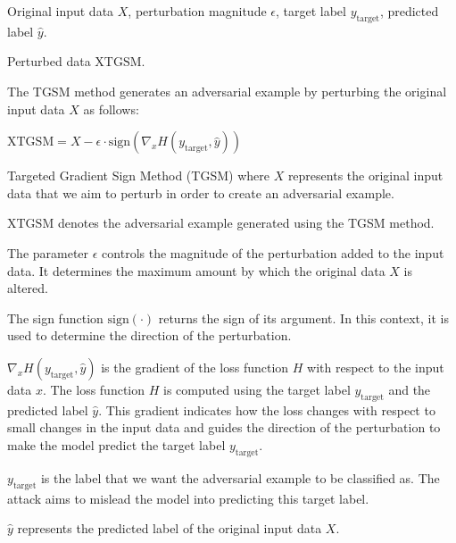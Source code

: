 
Original input data $X$, perturbation magnitude $\epsilon$, target label $y_{\text{target}}$, predicted label $\hat{y}$.

Perturbed data $\text{XTGSM}$.

The TGSM method generates an adversarial example by perturbing the original input data $X$ as follows:

$\text{XTGSM} = X - \epsilon \cdot \text{sign} \left( \nabla_x H(y_{\text{target}}, \hat{y}) \right)$

Targeted Gradient Sign Method (TGSM) where $X$ represents the original input data that we aim to perturb in order to create an adversarial example.

$\text{XTGSM}$ denotes the adversarial example generated using the TGSM method.

The parameter $\epsilon$ controls the magnitude of the perturbation added to the input data. It determines the maximum amount by which the original data $X$ is altered.

The sign function $\text{sign} \left( \cdot \right)$ returns the sign of its argument. In this context, it is used to determine the direction of the perturbation.

$\nabla_x H(y_{\text{target}}, \hat{y})$ is the gradient of the loss function $H$ with respect to the input data $x$. The loss function $H$ is computed using the target label $y_{\text{target}}$ and the predicted label $\hat{y}$. This gradient indicates how the loss changes with respect to small changes in the input data and guides the direction of the perturbation to make the model predict the target label $y_{\text{target}}$.

$y_{\text{target}}$ is the label that we want the adversarial example to be classified as. The attack aims to mislead the model into predicting this target label.

$\hat{y}$ represents the predicted label of the original input data $X$.